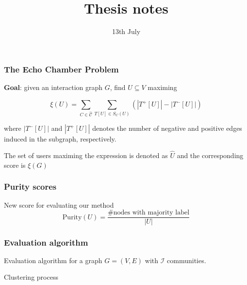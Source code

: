 \documentclass{beamer}
\title{Thesis notes}
\date{13th July}
\begin{document}
\frame{\titlepage}



\begin{frame}[c]
    \frametitle{The Echo Chamber Problem}
    \textbf{Goal}: given an interaction graph $G$, find $U \subseteq V$ maximing

    \begin{equation}
        \xi (U) = \sum^{}_{C \in \hat{\mathcal{C}} } \sum^{}_{T[U] \in S_C (U)}
        (| T^{+} [U] | - | T^{-} [U] |)
    \end{equation}

    where $| T^{-} [U] |$ and $| T^{+} [U] |$ denotes the number of negative
    and positive edges induced in the subgraph, respectively.

    \bigskip

    The set of users maximing the expression is denoted as $\hat{U}$ and the
    corresponding score is $\xi(G)$
\end{frame}

\begin{frame}[c]
    \frametitle{Purity scores}
    New score for evaluating our method
    \begin{equation}
        \text{Purity}(U) = \frac{\text{\# nodes with majority label}}{|U|} 
    \end{equation}
\end{frame}

\begin{frame}[c]
    \frametitle{Evaluation algorithm}

    Evaluation algorithm for a graph $G = (V, E)$ with $\mathcal{I} $
    communities.
    \bigskip

    \begin{algorithm}[H]
	\SetAlgoLined


	\caption{Clustering process}
	\label{alg:clustering_process}
\end{algorithm}
    
\end{frame}
\end{document}
